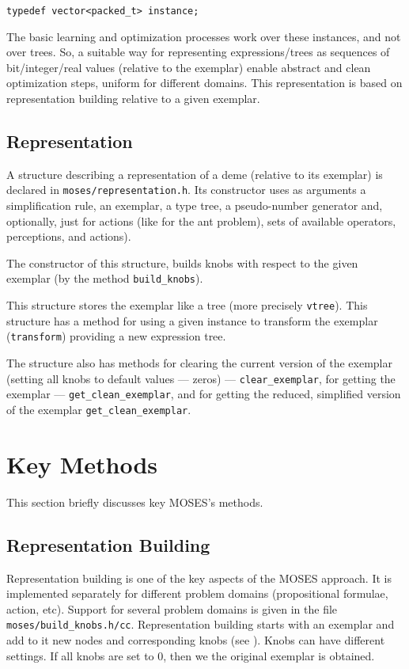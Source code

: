 \documentclass{article}
\begin{document}
\begin{verbatim}
typedef vector<packed_t> instance;
\end{verbatim}

The basic learning and optimization processes work over these instances,
and not over trees. So, a suitable way for representing expressions/trees 
as sequences of bit/integer/real values (relative to the exemplar) enable
abstract and clean optimization steps, uniform for different domains.
This representation is based on representation building relative to a
given exemplar.


\subsection{Representation}

A structure describing a representation of a deme (relative to its
exemplar) is declared 
in \verb|moses/representation.h|. Its constructor uses as arguments
a simplification rule, an exemplar, a type tree, a pseudo-number
generator and, optionally, just for actions (like for the ant problem),
sets of available operators, perceptions, and actions).

The constructor of this structure, builds knobs with respect to the
given exemplar (by the method \verb|build_knobs|).

This structure stores the exemplar like a tree (more precisely \verb|vtree|).
This structure has a method for using a given instance to transform 
the exemplar (\verb|transform|) providing a new expression tree. 

The structure also has methods for clearing the current version of
the exemplar (setting all knobs to default values --- zeros) ---
\verb|clear_exemplar|, for getting the exemplar ---
\verb|get_clean_exemplar|, and for getting the reduced, simplified 
version of the exemplar \verb|get_clean_exemplar|.


\section{Key Methods}

This section briefly discusses key MOSES's methods.

\subsection{Representation Building}

Representation building is one of the key aspects of the MOSES approach. 
It is implemented separately for different problem domains (propositional
formulae, action, etc). Support for several problem domains is given in 
the file \verb|moses/build_knobs.h/cc|. 
Representation building starts with an exemplar and add to it new nodes
and corresponding knobs (see \cite{6}). Knobs can have different settings. 
If all knobs are set to 0, then we the original exemplar is obtained. 
\end{document}

